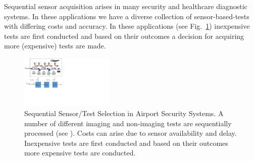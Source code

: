 Sequential sensor acquisition arises in many security and healthcare diagnostic systems. In these applications we have a diverse collection of sensor-based-tests with differing costs and accuracy. %
In these applications (see Fig.~\ref{motiv}) inexpensive tests are first conducted and based on their outcomes a decision for acquiring more (expensive) tests are made. %
\begin{figure}[t]
  \centering
  \includegraphics[width=0.4\textwidth]{motiv.pdf}
  \caption{\footnotesize Sequential Sensor/Test Selection in Airport Security Systems. A number of different imaging and non-imaging tests are sequentially processed (see \cite{ML13_MultistageClassifier_TrapezSaligramaCastanon}). Costs can arise due to sensor availability and delay. Inexpensive tests are first conducted and based on their outcomes more expensive tests are conducted.}
  \label{motiv}
\vspace{-15pt}
\end{figure}
